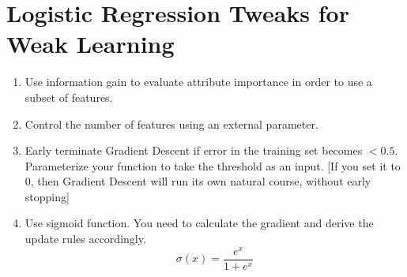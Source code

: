 \documentclass[11pt, a4paper]{article}
\begin{document}
\section{Logistic Regression Tweaks for Weak Learning}
\begin{enumerate}
    \item Use information gain to evaluate attribute importance in order to use a subset of features.
    \item Control the number of features using an external parameter.
    \item Early terminate Gradient Descent if error in the training set becomes $<0.5$. Parameterize your function to take the threshold as an input. [If you set it to 0, then Gradient Descent will run its own natural course, without early stopping]
    \item Use sigmoid function. You need to calculate the gradient and derive the update rules accordingly.
    \[
    \sigma(x) = \frac{e^x}{1 + e^x}
    \]
\end{enumerate}

\end{document}

